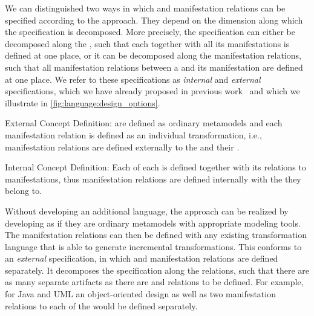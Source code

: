 We can distinguished two ways in which \conceptmetamodels and manifestation relations can be specified according to the \commonalities approach.
They depend on the dimension along which the specification is decomposed.
More precisely, the specification can either be decomposed along the \commonalities, such that each \commonality together with all its manifestations is defined at one place, or it can be decomposed along the manifestation relations, such that all manifestation relations between a \conceptmetamodel and its manifestation are defined at one place.
We refer to these specifications as \emph{internal} and \emph{external} specifications, which we have already proposed in previous work~ and which we illustrate in \autoref{fig:language:design_options}.
\begin{properdescription}
    \item[External Concept Definition:] \Conceptmetamodels are defined as ordinary metamodels and each manifestation relation is defined as an individual transformation, i.e., manifestation relations are defined externally to the \conceptmetamodels and their \commonalities.
    \item[Internal Concept Definition:] Each \commonality of each \conceptmetamodel is defined together with its relations to manifestations, thus manifestation relations are defined internally with the \commonalities they belong to.
\end{properdescription}

Without developing an additional language, the \commonalities approach can be realized by developing \conceptmetamodels as if they are ordinary metamodels with appropriate modeling tools.
The manifestation relations can then be defined with any existing transformation language that is able to generate incremental transformations. %
This conforms to an \emph{external} specification, in which \conceptmetamodels and manifestation relations are defined separately.
It decomposes the specification along the relations, such that there are as many separate artifacts as there are \conceptmetamodels and relations to be defined. %
For example, for Java and \gls{UML} an object-oriented design \conceptmetamodel as well as two manifestation relations to each of the \concretemetamodels would be defined separately.

